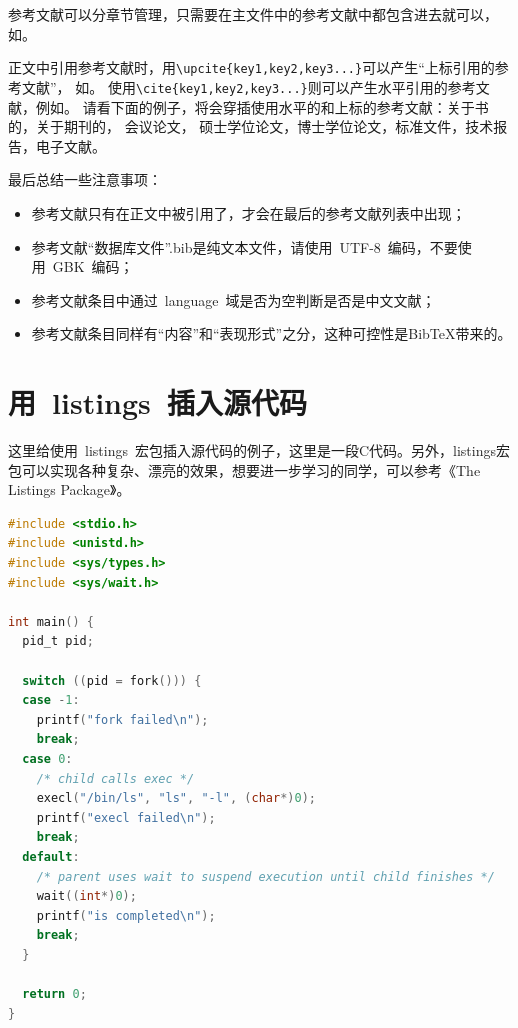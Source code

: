 参考文献可以分章节管理，只需要在主文件中的参考文献中都包含进去就可以，如\verb++。

正文中引用参考文献时\citep{Jiang2005Size}，用\verb+\upcite{key1,key2,key3...}+可以产生“上标引用的参考文献”，
如。
使用\verb+\cite{key1,key2,key3...}+则可以产生水平引用的参考文献，例如\cite{JohnD,zhubajie,IEEE-1363}。
请看下面的例子，将会穿插使用水平的和上标的参考文献：关于书的\cite{Meta_CN,JohnD,IEEE-1363}，关于期刊的，
会议论文\cite{DPMG,kocher99,cnproceed}，
硕士学位论文\cite{zhubajie,metamori2004}，博士学位论文，标准文件\cite{IEEE-1363}，技术报告，电子文献\cite{xiaoyu2001, CHRISTINE1998}。

最后总结一些注意事项：
\begin{itemize}
\item  参考文献只有在正文中被引用了，才会在最后的参考文献列表中出现；
\item  参考文献``数据库文件''.bib是纯文本文件，请使用~UTF-8~编码，不要使用~GBK~编码；
\item  参考文献条目中通过~language~域是否为空判断是否是中文文献；
\item  参考文献条目同样有“内容”和“表现形式”之分，这种可控性是BibTeX带来的。
\end{itemize}


\section{用~listings~插入源代码}

这里给使用~listings~宏包插入源代码的例子，这里是一段C代码。另外，listings宏包可以实现各种复杂、漂亮的效果，想要进一步学习的同学，可以参考《The Listings Package》。

\begin{lstlisting}[language={C}, caption={一段C源代码}]
#include <stdio.h>
#include <unistd.h>
#include <sys/types.h>
#include <sys/wait.h>

int main() {
  pid_t pid;

  switch ((pid = fork())) {
  case -1:
    printf("fork failed\n");
    break;
  case 0:
    /* child calls exec */
    execl("/bin/ls", "ls", "-l", (char*)0);
    printf("execl failed\n");
    break;
  default:
    /* parent uses wait to suspend execution until child finishes */
    wait((int*)0);
    printf("is completed\n");
    break;
  }

  return 0;
}
\end{lstlisting}

